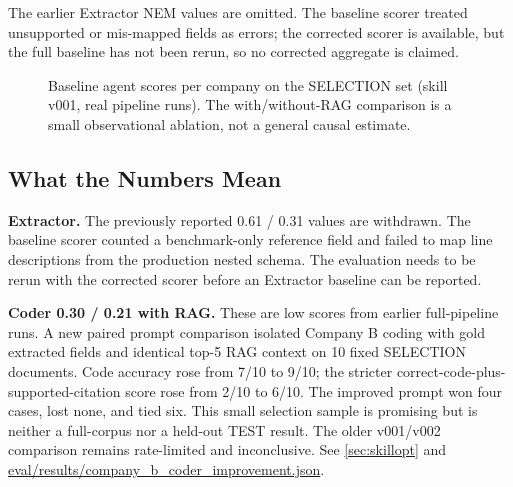 The earlier Extractor NEM values are omitted. The baseline scorer treated
unsupported or mis-mapped fields as errors; the corrected scorer is available,
but the full baseline has not been rerun, so no corrected aggregate is claimed.

\begin{figure}[ht]
\centering
{}
\caption{Baseline agent scores per company on the SELECTION set (skill v001,
real pipeline runs). The with/without-RAG comparison is a small observational
ablation, not a general causal estimate.}
\label{fig:baseline_bars}
\end{figure}

\subsection{What the Numbers Mean}

\textbf{Extractor.} The previously reported 0.61 / 0.31 values are withdrawn.
The baseline scorer counted a benchmark-only reference field and failed to map
line descriptions from the production nested schema. The evaluation needs to be
rerun with the corrected scorer before an Extractor baseline can be reported.

\textbf{Coder 0.30 / 0.21 with RAG.}
These are low scores from earlier full-pipeline runs. A new paired prompt
comparison isolated Company B coding with gold extracted fields and identical
top-5 RAG context on 10 fixed SELECTION documents. Code accuracy rose from
7/10 to 9/10; the stricter correct-code-plus-supported-citation score rose
from 2/10 to 6/10. The improved prompt won four cases, lost none, and tied six.
This small selection sample is promising but is neither a full-corpus nor a
held-out TEST result. The older v001/v002 comparison remains rate-limited and
inconclusive. See \cref{sec:skillopt} and
\url{eval/results/company_b_coder_improvement.json}.

